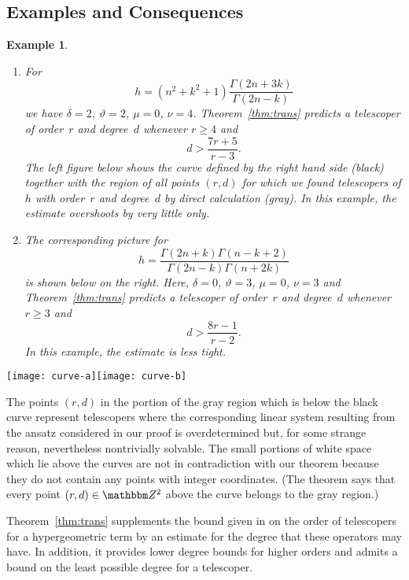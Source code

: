 \documentclass{sig-alternate}
\newtheorem{example}[theorem]{Example}
\let\set\mathbbm
\begin{document}
\subsection{Examples and Consequences}

\begin{example}\label{ex:trans}
\begin{enumerate}
\item For
  \[
    h=(n^2+k^2+1)\frac{\Gamma(2n+3k)}{\Gamma(2n-k)}
  \]
  we have $\delta=2$, $\vartheta=2$, $\mu=0$, $\nu=4$. Theorem~\ref{thm:trans} predicts
  a telescoper of order~$r$ and degree~$d$ whenever $r\geq4$ and
  \[
    d>\frac{7r+5}{r-3}.
  \]
  The left figure below shows the curve defined by the right hand side (black) together with
  the region of all points $(r,d)$ for which we found telescopers of $h$ with order~$r$
  and degree~$d$ by direct calculation (gray).
  In this example, the estimate overshoots by very little only.
\item The corresponding picture for
  \[
    h=\frac{\Gamma(2n+k)\Gamma(n-k+2)}{\Gamma(2n-k)\Gamma(n+2k)}
  \]
  is shown below on the right. Here, $\delta=0$, $\vartheta=3$, $\mu=0$, $\nu=3$ and
  Theorem~\ref{thm:trans} predicts a telescoper of order~$r$ and degree~$d$ whenever $r\geq3$
  and
  \[
    d>\frac{8r-1}{r-2}.
  \]
  In this example, the estimate is less tight.



\end{enumerate}
\end{example}

\centerline{\texttt{[image: curve-a]}\hfil\texttt{[image: curve-b]}}

\medskip

The points $(r,d)$ in the portion of the gray region which is below the black curve
represent telescopers where the corresponding linear system resulting from the ansatz considered
in our proof is overdetermined but, for some strange reason, nevertheless nontrivially solvable. 
The small portions of white space which lie above the curves are not in contradiction with our 
theorem because they do not contain any points with integer coordinates. (The theorem says that
every point $(r,d)\in\set Z^2$ above the curve belongs to the gray region.)

Theorem~\ref{thm:trans} supplements the bound given in \cite{mohammed05} on the order
of telescopers for a hypergeometric term by an estimate for the degree that these
operators may have. In addition, it provides lower degree bounds for higher orders
and admits a bound on the least possible degree for a telescoper.
\end{document}
